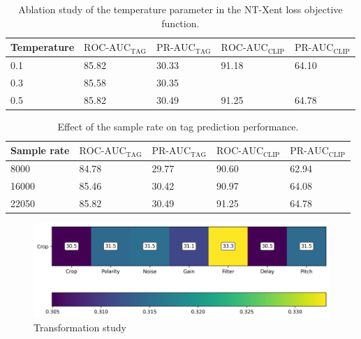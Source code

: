\begin{fullwidth}
\begin{table}
    \centering
    \begin{tabular}{lllll}\toprule
    Temperature & $\text{ROC-AUC}_{\text{TAG}}$ & $\text{PR-AUC}_{\text{TAG}}$ & $\text{ROC-AUC}_{\text{CLIP}}$ & $\text{PR-AUC}_{\text{CLIP}}$ \\\midrule
    0.1         & 85.82                         & 30.33                        & 91.18                          & 64.10                         \\
    0.3         & 85.58                         & 30.35                        &                                &                               \\
    0.5         & 85.82                         & 30.49                        & 91.25                          & 64.78 \\                       
    \bottomrule
    \end{tabular}
    \caption{Ablation study of the temperature parameter in the NT-Xent loss objective function.}
    \label{tab:temperature_ablation}
\end{table}
\end{fullwidth}

\begin{fullwidth}
    \begin{table}
        \centering
            \begin{tabular}{lllll}\toprule
            Sample rate & $\text{ROC-AUC}_{\text{TAG}}$ & $\text{PR-AUC}_{\text{TAG}}$ & $\text{ROC-AUC}_{\text{CLIP}}$ & $\text{PR-AUC}_{\text{CLIP}}$ \\\midrule
            8000 & 84.78 & 29.77 & 90.60 & 62.94 \\
            16000 & 85.46 & 30.42 & 90.97 & 64.08 \\
            22050 & 85.82 & 30.49 & 91.25 & 64.78 \\                       
            \bottomrule
            \end{tabular}
        \caption{Effect of the sample rate on tag prediction performance.}
        \label{tab:temperature_ablation}
    \end{table}
\end{fullwidth}

\begin{figure}[t]
    \centering
    \includegraphics[width=\columnwidth]{figs/transformation_study.png}
    \caption{Transformation study}
    \label{fig:transformation_study}
\end{figure}

